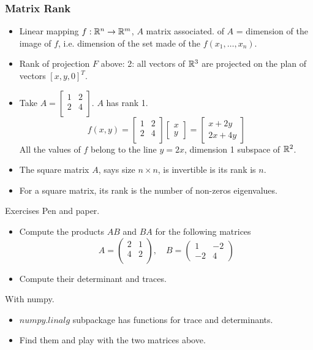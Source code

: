 \documentclass[8pt,dvipsnames]{beamer}
\newcommand{\myemph}[1]{{\color{blue}{#1}}}
\begin{document}
\begin{frame}
  \frametitle{Matrix Rank}
  \begin{itemize}
  \item Linear mapping $f:{\mathbb R}^n \to {\mathbb R}^m$, $A$ matrix associated. \myemph{Rank} of $A$ = dimension of the image of $f$, i.e. dimension of the 
    set made of the $f(x_1,\dots,x_n)$.
  \item Rank of projection $F$ above: 2: all vectors of ${\mathbb R}^3$ are projected on the plan of vectors $[x,y,0]^T$.
  \item Take $A =
    \begin{bmatrix}
      1 & 2\\
      2 & 4\\
    \end{bmatrix}
    $. $A$ has rank 1. 
    $$
    f(x,y) =  \begin{bmatrix}
      1 & 2\\
      2 & 4\\
    \end{bmatrix}
    \begin{bmatrix}
      x\\y
    \end{bmatrix}
    =
    \begin{bmatrix}
      x + 2y\\
      2x + 4y
    \end{bmatrix}
    $$
    All the values of $f$ belong to the line $y = 2x$, dimension 1 subspace of ${\mathbb R}^2$.
  \item The square matrix $A$, says size $n\times n$, is invertible is its rank is $n$.
  \item For a square matrix, its rank is the number of non-zeros eigenvalues.
  \end{itemize}
\end{frame}





\begin{frame}{Exercises}
  Pen and paper.
  \begin{itemize}
  \item Compute the products $AB$ and $BA$ for the following matrices
    $$A =
    \begin{pmatrix}
      2 & 1\\
      4 & 2\\
    \end{pmatrix},\quad
    B =
    \begin{pmatrix}
      1 & -2\\
      -2 & 4
    \end{pmatrix}
    $$
  \item Compute their determinant and traces.
  \end{itemize}
  With numpy.
  \begin{itemize}
  \item  $numpy.linalg$ subpackage has functions for trace and determinants.
  \item Find them and play with the two matrices above.
  \end{itemize}
 
\end{frame}
\end{document}
